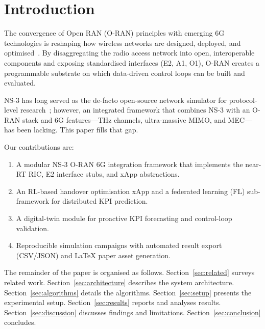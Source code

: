 \section{Introduction}
\label{sec:intro}

The convergence of Open RAN (O-RAN) principles with emerging 6G
technologies is reshaping how wireless networks are designed, deployed,
and optimised~\cite{oran_alliance2022,6g_survey2023}.
By disaggregating the radio access network into open, interoperable
components and exposing standardised interfaces (E2, A1, O1), O-RAN
creates a programmable substrate on which data-driven control loops can
be built and evaluated.

NS-3 has long served as the de-facto open-source network simulator for
protocol-level research~\cite{ns3_main}; however, an integrated
framework that combines NS-3 with an O-RAN stack and 6G features---THz
channels, ultra-massive MIMO, and MEC---has been lacking.
This paper fills that gap.

Our contributions are:
\begin{enumerate}
  \item A modular NS-3 O-RAN 6G integration framework that implements the
        near-RT RIC, E2 interface stubs, and xApp abstractions.
  \item An RL-based handover optimisation xApp and a federated learning
        (FL) sub-framework for distributed KPI prediction.
  \item A digital-twin module for proactive KPI forecasting and
        control-loop validation.
  \item Reproducible simulation campaigns with automated result export
        (CSV/JSON) and LaTeX paper asset generation.
\end{enumerate}

The remainder of the paper is organised as follows.
Section~\ref{sec:related} surveys related work.
Section~\ref{sec:architecture} describes the system architecture.
Section~\ref{sec:algorithms} details the algorithms.
Section~\ref{sec:setup} presents the experimental setup.
Section~\ref{sec:results} reports and analyses results.
Section~\ref{sec:discussion} discusses findings and limitations.
Section~\ref{sec:conclusion} concludes.
